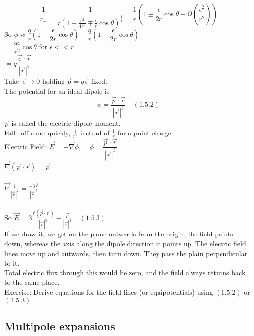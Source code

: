 \documentclass[a4paper,11pt]{article}
\begin{document}
$$\frac{1}{r_{\pm}}=\dfrac{1}{r(1+\frac{\epsilon^2}{4r^2} \mp\frac{\epsilon}{r}\cos\theta)^\frac{1}{2}}=\frac{1}{r}(1\pm\frac{\epsilon}{2r}\cos\theta+O(\frac{\epsilon^2}{r^2}))$$
So $\phi \approx \dfrac{q}{r}(1+\dfrac{\epsilon}{2r}\cos\theta)-\dfrac{q}{r}(1-\dfrac{\epsilon}{2r}\cos\theta)$\\
$=\dfrac{q\epsilon}{r^2}\cos\theta$ for $\epsilon <<r$\\
$=q\dfrac{\vec{\epsilon}\cdot \vec{r}}{|\vec{r}|^3}$\\
Take $\vec{\epsilon}\rightarrow 0$ holding $\vec{p}=q\vec{\epsilon}$ fixed:\\
The potential for an ideal dipole is
$$\phi=\dfrac{\vec{p}\cdot\vec{r}}{|\vec{r}|^3}~~~~~(1.5.2)$$
$\vec{p}$ is called the electric dipole moment.\\
Falls off more quickly, $\frac{1}{r^2}$ instead of $\frac{1}{r}$ for a point charge.\\
Electric Field: $\vec{E}=-\vec{\nabla}\phi,~~~~~\phi=\dfrac{\vec{p}\cdot\vec{r}}{|\vec{r}|^3}$\\
$\vec{\nabla}(\vec{p}\cdot\vec{r})=\vec{p}$\\
\\
$\vec{\nabla}\frac{1}{|\vec{r}|^2}=\frac{-3\vec{r}}{|\vec{r}|^5}$\\
\\
So $\vec{E}=3\frac{\vec{r}(\vec{p}\cdot \vec{r})}{|\vec{r}|^5}-\frac{\vec{p}}{|\vec{r}|^3}~~~~~(1.5.3)$\\
If we draw it, we get on the plane outwards from the origin, the field points down, whereas the axis along the dipole direction it points up. The electric field lines move up and outwards, then turn down. They pass the plain perpendicular to it.\\
Total electric flux through this would be zero, and the field always returns back to the same place.\\
Exercise: Derive equations for the field lines (or equipotentials) using $(1.5.2)$ or $(1.5.3)$

\subsection{Multipole expansions}
\end{document}
